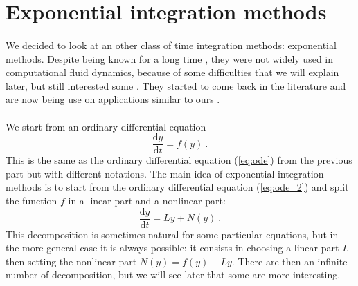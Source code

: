   \section{Exponential integration methods}

    \paragraph{}
    We decided to look at an other class of time integration methods: exponential methods.
    Despite being known for a long time \cite{Pope1963}, they were not widely used in computational fluid dynamics, because of some difficulties that we will explain later, but still interested some \cite{EdwardsTuckermanFriesnerEtAl1994}.
    They started to come back in the literature \cite{HochbruckOstermann2005} and are now being use on applications similar to ours \cite{NieZhangZhao2006, BhattKhaliqWade2018}.

    \paragraph{}
    We start from an ordinary differential equation
    \begin{equation}\label{eq:ode_2}
      \frac{\mathrm{d} y}{\mathrm{d} t} = f\left(y\right) \ .
    \end{equation}
    This is the same as the ordinary differential equation (\ref{eq:ode}) from the previous part but with different notations.
    The main idea of exponential integration methods is to start from the ordinary differential equation (\ref{eq:ode_2}) and split the function $f$ in a linear part and a nonlinear part:
    \begin{equation}
      \frac{\mathrm{d} y}{\mathrm{d} t} = Ly + N\left(y\right) \ .
    \end{equation}
    This decomposition is sometimes natural for some particular equations, but in the more general case it is always possible: it consists in choosing a linear part $L$ then setting the nonlinear part $N\left(y\right) = f(y) - Ly$.
    There are then an infinite number of decomposition, but we will see later that some are more interesting.

